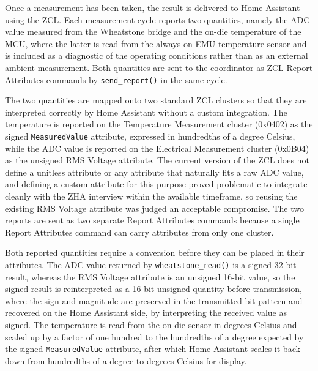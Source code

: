 Once a measurement has been taken, the result is delivered to Home Assistant using the ZCL.
Each measurement cycle reports two quantities, namely the ADC value measured from the Wheatstone bridge and the on-die temperature of the MCU, where the latter is read from the always-on EMU temperature sensor and is included as a diagnostic of the operating conditions rather than as an external ambient measurement.
Both quantities are sent to the coordinator as ZCL Report Attributes commands by \texttt{send\_report()} in the same cycle.

The two quantities are mapped onto two standard ZCL clusters so that they are interpreted correctly by Home Assistant without a custom integration.
The temperature is reported on the Temperature Measurement cluster (0x0402) as the signed \texttt{MeasuredValue} attribute, expressed in hundredths of a degree Celsius, while the ADC value is reported on the Electrical Measurement cluster (0x0B04) as the unsigned RMS Voltage attribute.
The current version of the ZCL does not define a unitless attribute or any attribute that naturally fits a raw ADC value, and defining a custom attribute for this purpose proved problematic to integrate cleanly with the ZHA interview within the available timeframe, so reusing the existing RMS Voltage attribute was judged an acceptable compromise.
The two reports are sent as two separate Report Attributes commands because a single Report Attributes command can carry attributes from only one cluster.

Both reported quantities require a conversion before they can be placed in their attributes.
The ADC value returned by \texttt{wheatstone\_read()} is a signed 32-bit result, whereas the RMS Voltage attribute is an unsigned 16-bit value, so the signed result is reinterpreted as a 16-bit unsigned quantity before transmission, where the sign and magnitude are preserved in the transmitted bit pattern and recovered on the Home Assistant side, by interpreting the received value as signed.
The temperature is read from the on-die sensor in degrees Celsius and scaled up by a factor of one hundred to the hundredths of a degree expected by the signed \texttt{MeasuredValue} attribute, after which Home Assistant scales it back down from hundredths of a degree to degrees Celsius for display.

